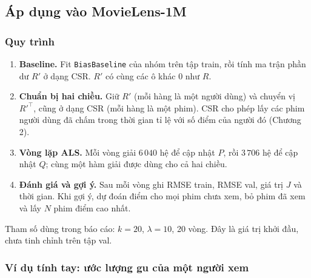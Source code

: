 \subsection{Áp dụng vào MovieLens-1M}

\subsubsection{Quy trình}

\begin{enumerate}
  \item \textbf{Baseline.} Fit \texttt{BiasBaseline} của nhóm trên tập train, rồi tính ma trận phần
        dư $R'$ ở dạng CSR. $R'$ có cùng các ô khác 0 như $R$.
  \item \textbf{Chuẩn bị hai chiều.} Giữ $R'$ (mỗi hàng là một người dùng) và chuyển vị $R'^\top$,
        cũng ở dạng CSR (mỗi hàng là một phim). CSR cho phép lấy các phim người dùng đã chấm trong
        thời gian tỉ lệ với số điểm của người đó (Chương 2).
  \item \textbf{Vòng lặp ALS.} Mỗi vòng giải $6\,040$ hệ để cập nhật $P$, rồi $3\,706$ hệ để cập
        nhật $Q$; cùng một hàm giải được dùng cho cả hai chiều.
  \item \textbf{Đánh giá và gợi ý.} Sau mỗi vòng ghi RMSE train, RMSE val, giá trị $J$ và thời gian.
        Khi gợi ý, dự đoán điểm cho mọi phim chưa xem, bỏ phim đã xem và lấy $N$ phim điểm cao nhất.
\end{enumerate}
Tham số dùng trong báo cáo: $k = 20$, $\lambda = 10$, 20 vòng. Đây là giá trị khởi đầu, chưa tinh
chỉnh trên tập val.

\subsubsection{Ví dụ tính tay: ước lượng gu của một người xem}

